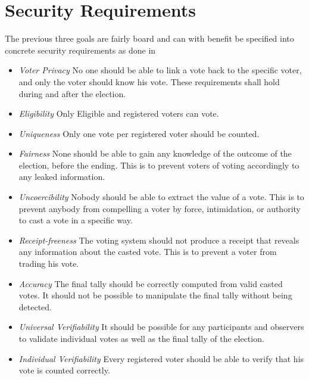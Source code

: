 \section{Security Requirements} \label{sec:security_requirements}
The previous three goals are fairly board and can with benefit be specified into concrete security requirements as done in \cite{Cet08}

\begin{itemize}
    \item \textit{Voter Privacy}
        No one should be able to link a vote back to the specific voter, and only the voter should
        know his vote. These requirements shall hold during and after the election.  
    
    \item \textit{Eligibility}    
        Only Eligible and registered voters can vote. 
    
    \item \textit{Uniqueness}
        Only one vote per registered voter should be counted.
    
    \item \textit{Fairness}
        None should be able to gain any knowledge of the outcome of the election, before the ending. This is to prevent voters of voting accordingly to any leaked information. 
    
    \item \textit{Uncoercibility}
        Nobody should be able to extract the value of a vote. This is to prevent anybody from compelling a voter by force, intimidation, or authority to cast a vote in a specific way. 
    
    \item \textit{Receipt-freeness} 
        The voting system should not produce a receipt that reveals any information about the casted vote. This is to prevent a voter from trading his vote. 
    
    \item \textit{Accuracy} 
        The final tally should be correctly computed from valid casted votes. It should not be
        possible to manipulate the final tally without being detected. 
    
    \item \textit{Universal Verifiability}
        It should be possible for any participants and observers to validate individual votes as well as the final tally of the election. 
    
    \item \textit{Individual Verifiability}    
        Every registered voter should be able to verify that his vote is counted correctly. 
    
\end{itemize}



